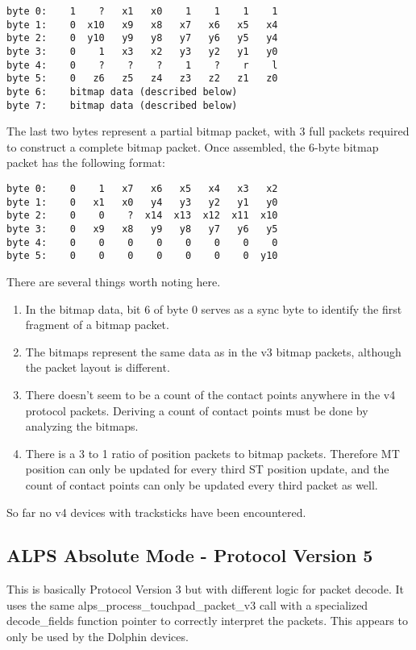 \documentclass[a4paper,8pt,english]{sphinxmanual}
\begin{document}
\begin{Verbatim}[commandchars=\\\{\}]
byte 0:    1    ?   x1   x0    1    1    1    1
byte 1:    0  x10   x9   x8   x7   x6   x5   x4
byte 2:    0  y10   y9   y8   y7   y6   y5   y4
byte 3:    0    1   x3   x2   y3   y2   y1   y0
byte 4:    0    ?    ?    ?    1    ?    r    l
byte 5:    0   z6   z5   z4   z3   z2   z1   z0
byte 6:    bitmap data (described below)
byte 7:    bitmap data (described below)
\end{Verbatim}

The last two bytes represent a partial bitmap packet, with 3 full packets
required to construct a complete bitmap packet.  Once assembled, the 6-byte
bitmap packet has the following format:

\begin{Verbatim}[commandchars=\\\{\}]
byte 0:    0    1   x7   x6   x5   x4   x3   x2
byte 1:    0   x1   x0   y4   y3   y2   y1   y0
byte 2:    0    0    ?  x14  x13  x12  x11  x10
byte 3:    0   x9   x8   y9   y8   y7   y6   y5
byte 4:    0    0    0    0    0    0    0    0
byte 5:    0    0    0    0    0    0    0  y10
\end{Verbatim}

There are several things worth noting here.
\begin{enumerate}
\item {} 
In the bitmap data, bit 6 of byte 0 serves as a sync byte to
identify the first fragment of a bitmap packet.

\item {} 
The bitmaps represent the same data as in the v3 bitmap packets, although
the packet layout is different.

\item {} 
There doesn't seem to be a count of the contact points anywhere in the v4
protocol packets. Deriving a count of contact points must be done by
analyzing the bitmaps.

\item {} 
There is a 3 to 1 ratio of position packets to bitmap packets. Therefore
MT position can only be updated for every third ST position update, and
the count of contact points can only be updated every third packet as
well.

\end{enumerate}

So far no v4 devices with tracksticks have been encountered.


\subsection{ALPS Absolute Mode - Protocol Version 5}
\label{input/devices/alps:alps-absolute-mode-protocol-version-5}
This is basically Protocol Version 3 but with different logic for packet
decode.  It uses the same alps\_process\_touchpad\_packet\_v3 call with a
specialized decode\_fields function pointer to correctly interpret the
packets.  This appears to only be used by the Dolphin devices.
\end{document}
